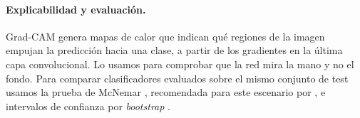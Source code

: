 \paragraph{Explicabilidad y evaluación.}
Grad-CAM \citep{selvaraju2017gradcam} genera mapas de calor que indican qué regiones de la
imagen empujan la predicción hacia una clase, a partir de los gradientes en la última capa
convolucional. Lo usamos para comprobar que la red mira la mano y no el fondo. Para comparar
clasificadores evaluados sobre el mismo conjunto de test usamos la prueba de McNemar
\citep{mcnemar1947}, recomendada para este escenario por \citet{dietterich1998tests}, e
intervalos de confianza por \emph{bootstrap} \citep{efron1993bootstrap}.
